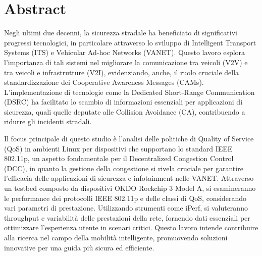 \thispagestyle{plain}
\section*{Abstract}
Negli ultimi due decenni, la sicurezza stradale ha beneficiato di significativi progressi tecnologici, in particolare attraverso lo sviluppo di Intelligent Transport Systems (ITS) e Vehicular Ad-hoc Networks (VANET). Questo lavoro esplora l'importanza di tali sistemi nel migliorare la comunicazione tra veicoli (V2V) e tra veicoli e infrastrutture (V2I), evidenziando, anche, il ruolo cruciale della standardizzazione dei Cooperative Awareness Messages (CAMs). L'implementazione di tecnologie come la Dedicated Short-Range Communication (DSRC) ha facilitato lo scambio di informazioni essenziali per applicazioni di sicurezza, quali quelle deputate alle Collision Avoidance (CA), contribuendo a ridurre gli incidenti stradali.

Il focus principale di questo studio è l'analisi delle politiche di Quality of Service (QoS) in ambienti Linux per dispositivi che supportano lo standard IEEE 802.11p, un aspetto fondamentale per il Decentralized Congestion Control (DCC), in quanto la gestione della congestione si rivela cruciale per garantire l'efficacia delle applicazioni di sicurezza e infotainment nelle VANET. Attraverso un testbed composto da dispositivi OKDO Rockchip 3 Model A, si esamineranno le performance dei protocolli IEEE 802.11p e delle classi di QoS, considerando vari parametri di prestazione. Utilizzando strumenti come iPerf, si valuteranno throughput e variabilità delle prestazioni della rete, fornendo dati essenziali per ottimizzare l'esperienza utente in scenari critici. Questo lavoro intende contribuire alla ricerca nel campo della mobilità intelligente, promuovendo soluzioni innovative per una guida più sicura ed efficiente.
